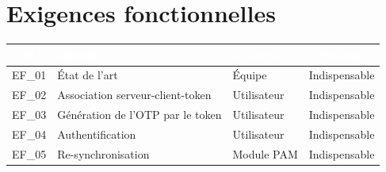 \documentclass{"../../res/univ-projet"}
\begin{document}
\section{Exigences fonctionnelles}
\begin{tabular}{|c|l|l|c|}
    \hline
    \rowcolor{gray}
    \textcolor{white}{Id} & \textcolor{white}{Intitulé} & \textcolor{white}{Acteur(s)} & \textcolor{white}{Priorité}\\
    \hline
    EF\_01 & État de l'art & Équipe & Indispensable\\
    \hline
    EF\_02 & Association serveur-client-token & Utilisateur & Indispensable\\
    \hline
    EF\_03 & Génération de l'OTP par le token & Utilisateur & Indispensable\\
    \hline
    EF\_04 & Authentification & Utilisateur & Indispensable\\
    \hline
    EF\_05 & Re-synchronisation & Module PAM & Indispensable\\
    \hline
\end{tabular}\
\newpage
\end{document}
